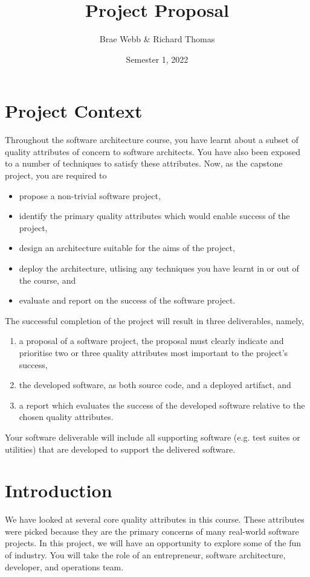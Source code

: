 \documentclass{csse4400}
\title{Project Proposal}
\author{Brae Webb \& Richard Thomas}
\date{Semester 1, 2022}
\begin{document}
\maketitle

\section*{Project Context}
Throughout the software architecture course,
you have learnt about a subset of quality attributes of concern to software architects.
You have also been exposed to a number of techniques to satisfy these attributes.
Now, as the capstone project, you are required to
\begin{itemize}
    \item propose a non-trivial software project,
    \item identify the primary quality attributes which would enable success of the project,
    \item design an architecture suitable for the aims of the project,
    \item deploy the architecture, utlising any techniques you have learnt in or out of the course, and
    \item evaluate and report on the success of the software project.
\end{itemize}

\noindent
The successful completion of the project will result in three deliverables, namely,
\begin{enumerate}[label=\roman*]
    \item a proposal of a software project, the proposal must clearly indicate and prioritise two or three quality attributes most important to the project's success,
    \item the developed software,	 as both source code, and a deployed artifact, and
    \item a report which evaluates the success of the developed software relative to the chosen quality attributes.
\end{enumerate}

\noindent
Your software deliverable will include all supporting software (e.g. test suites or utilities) that are developed to support the delivered software.

\section{Introduction}
We have looked at several core quality attributes in this course.
These attributes were picked because they are the primary concerns of many real-world software projects.
In this project, we will have an opportunity to explore some of the fun of industry.
You will take the role of an entrepreneur, software architecture, developer, and operations team.
\end{document}
